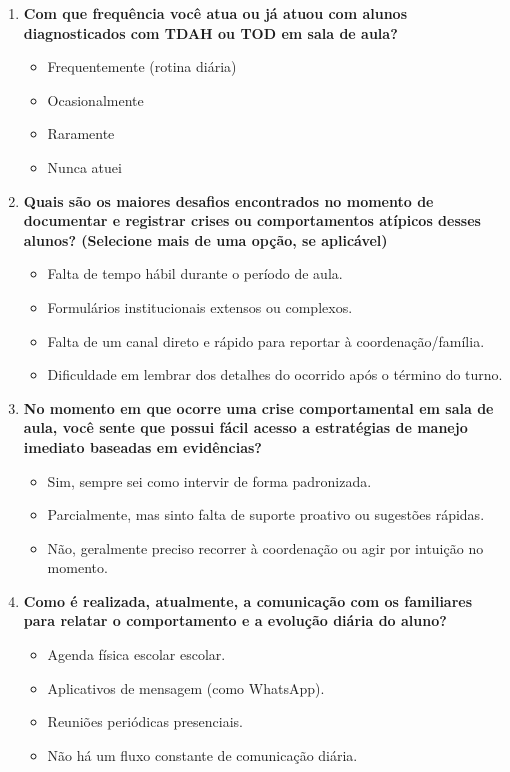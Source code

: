 \begin{apendicesenv}
\begin{enumerate}
    \item \textbf{Com que frequência você atua ou já atuou com alunos diagnosticados com TDAH ou TOD em sala de aula?}
    \begin{itemize}
        \item[ ] Frequentemente (rotina diária)
        \item[ ] Ocasionalmente
        \item[ ] Raramente
        \item[ ] Nunca atuei
    \end{itemize}

    \item \textbf{Quais são os maiores desafios encontrados no momento de documentar e registrar crises ou comportamentos atípicos desses alunos? (Selecione mais de uma opção, se aplicável)}
    \begin{itemize}
        \item[ ] Falta de tempo hábil durante o período de aula.
        \item[ ] Formulários institucionais extensos ou complexos.
        \item[ ] Falta de um canal direto e rápido para reportar à coordenação/família.
        \item[ ] Dificuldade em lembrar dos detalhes do ocorrido após o término do turno.
    \end{itemize}

    \item \textbf{No momento em que ocorre uma crise comportamental em sala de aula, você sente que possui fácil acesso a estratégias de manejo imediato baseadas em evidências?}
    \begin{itemize}
        \item[ ] Sim, sempre sei como intervir de forma padronizada.
        \item[ ] Parcialmente, mas sinto falta de suporte proativo ou sugestões rápidas.
        \item[ ] Não, geralmente preciso recorrer à coordenação ou agir por intuição no momento.
    \end{itemize}

    \item \textbf{Como é realizada, atualmente, a comunicação com os familiares para relatar o comportamento e a evolução diária do aluno?}
    \begin{itemize}
        \item[ ] Agenda física escolar escolar.
        \item[ ] Aplicativos de mensagem (como WhatsApp).
        \item[ ] Reuniões periódicas presenciais.
        \item[ ] Não há um fluxo constante de comunicação diária.
    \end{itemize}


\end{enumerate}
\end{apendicesenv}
